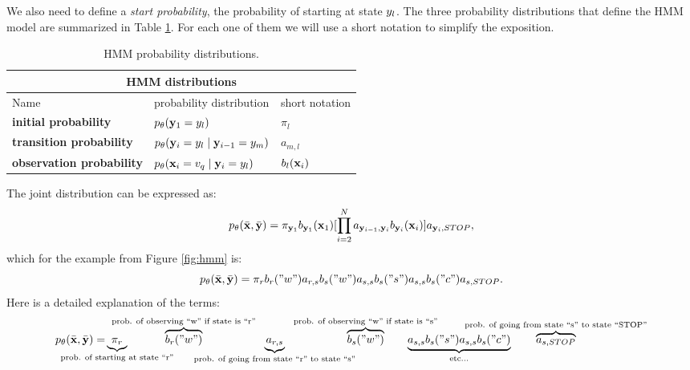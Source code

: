 We also need to define a \emph{start probability}, the probability of starting 
at state ${y}_l$.
 The three probability
distributions that define the HMM model are summarized in Table
\ref{tab:hmm-dist}. 
For each one
of them we will use a short notation to simplify the exposition.
\begin{table}[h]
\begin{center}
\begin{tabular}{|l|l|l|}
\hline
\multicolumn{3}{|c|}{HMM distributions}\\
\hline
Name & probability distribution & short notation \\
\hline
\textbf{initial probability} & $p_{\theta} (\mathbf{y}_1 = {y}_l)$ & $\pi_{l}$\\
\hline
\textbf{transition probability} & $p_{\theta} (\mathbf{y}_i = {y}_l \mid
\mathbf{y}_{i-1} = {y}_m)$ & $a_{m,l}$\\
\hline
\textbf{observation probability} & $p_{\theta}(\mathbf{x}_i = {v}_q\mid \mathbf{y}_i = {y}_l)$ & $b_l(\mathbf{x}_i) $ \\
\hline
\end{tabular}
\end{center}
\caption[HMM probability distributions]{\label{tab:hmm-dist} HMM probability distributions.}
\end{table}

The joint distribution can be expressed as:
\begin{equation}
  p_{\theta}(\bar{\mathbf{x}} ,\bar{\mathbf{y}}) =\pi_{\mathbf{y}_1}b_{\mathbf{y}_1}(\mathbf{x}_1) [\prod_{i=2}^{N}
  a_{\mathbf{y}_{i-1},\mathbf{y}_{i}} b_{\mathbf{y}_{i}}(\mathbf{x}_i)] a_{\mathbf{y}_{i},STOP},
  \label{eqn:hmm}
\end{equation}
which for the example from Figure \ref{fig:hmm} is:
\begin{equation}
  p_{\theta}(\bar{\mathbf{x}} ,\bar{\mathbf{y}}) =\pi_{r} b_r("w") a_{r,s}b_s("w") a_{s,s}b_s("s") a_{s,s}b_s("c")a_{s,STOP}.
  \label{eqn:hmm_ex}
\end{equation}
%
Here is a detailed explanation of the terms:
\begin{equation}
  \joint = \hspace{-1.5cm}\underbrace{\pi_{r}}_{\text{prob. of starting at state ``r''}} \hspace{-2cm}\overbrace{b_r("w")}^{\text{prob. of observing ``w'' if state is ``r''}} \hspace{-2cm}\underbrace{a_{r,s}}_{\text{prob. of going from state ``r'' to state ``s''}} \hspace{-2cm}\overbrace{b_s("w")}^{\text{prob. of observing ``w'' if state is ``s''}} \hspace{-1cm}\underbrace{a_{s,s}b_s("s") a_{s,s}b_s("c")}_{\text{etc...}} \hspace{-1.5cm}\overbrace{a_{s,STOP}}^{\text{prob. of going from state ``s'' to state ``STOP''}}
\end{equation}

